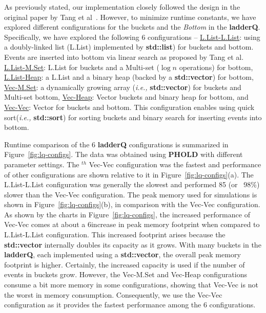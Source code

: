 As previously stated, our implementation closely followed the design in the original paper by Tang et al~\cite{tang-05}. However, to minimize runtime constants, we have explored different configurations for the buckets and the \emph{Bottom} in the \textbf{ladderQ}. Specifically, we have explored the
following 6 configurations --  \underline{L.List-L.List}: using a doubly-linked list (L.List) implemented by \textbf{std::list}) for buckets and bottom. Events are inserted into bottom via linear search as proposed by Tang et al.  \underline{L.List-M.Set}: L.List for buckets and a Multi-set ($\log n$ operations) for bottom,  \underline{L.List-Heap}: a L.List and a binary heap (backed by a \textbf{std::vector}) for bottom,  \underline{Vec-M.Set}: a dynamically growing array (\textit{i.e.,} \textbf{std::vector}) for buckets and Multi-set bottom,  \underline{Vec-Heap}: Vector buckets and binary heap for bottom, and  \underline{Vec-Vec}: Vector for buckets and bottom. This configuration enables using quick sort(\textit{i.e.,} \textbf{std::sort}) for sorting buckets and binary search for inserting events into bottom.

Runtime comparison of the 6 \textbf{ladderQ} configurations is summarized in Figure~\ref{fig:lq-configs}. The data was obtained using \textbf{PHOLD} with different parameter settings. The $^{th}$ Vec-Vec configuration was the fastest and performance of other configurations are shown relative to it in Figure~\ref{fig:lq-configs}(a). The L.List-L.List configuration was generally the slowest and performed 85 \texttimes (or ~98\%) slower than the Vec-Vec configuration. The peak memory used for simulations is shown in Figure~\ref{fig:lq-configs}(b), in comparison with the Vec-Vec configuration.  As shown by the charts in Figure~\ref{fig:lq-configs}, the increased performance of Vec-Vec comes at about a 6\texttimes increase in peak memory footprint when compared to L.List-L.List configuration. This increased footprint arises because the \textbf{std::vector} internally doubles its capacity as it grows. With many buckets in the \textbf{ladderQ}, each implemented using a \textbf{std::vector}, the overall peak memory footprint is higher. Certainly, the increased capacity is used if the number of events in buckets grow. However, the Vec-M.Set and Vec-Heap configurations consume a bit more memory in some configurations, showing that Vec-Vec is not the worst in memory consumption. Consequently, we use the Vec-Vec configuration as it provides the fastest performance among the 6 configurations.

